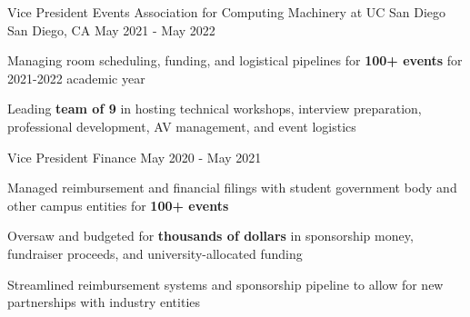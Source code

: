 \begin{cventries}
  \cventrytwo
    {Vice President Events} %
    {Association for Computing Machinery at UC San Diego} %
    {San Diego, CA} %
    {May 2021 - May 2022} %
    {
      \begin{cvitems} %
        \item {Managing room scheduling, funding, and logistical pipelines for \textbf{100+ events} for 2021-2022 academic year}
        \item {Leading \textbf{team of 9} in hosting technical workshops, interview preparation, professional development, AV management, and event logistics}
      \end{cvitems}
    }
    {Vice President Finance}
    {May 2020 - May 2021} %
    {
      \begin{cvitems} %
        \item {Managed reimbursement and financial filings with student government body and other campus entities for \textbf{100+ events}}
        \item {Oversaw and budgeted for \textbf{thousands of dollars} in sponsorship money, fundraiser proceeds, and university-allocated funding}
        \item {Streamlined reimbursement systems and sponsorship pipeline to allow for new partnerships with industry entities}
      \end{cvitems}
    }


\end{cventries}
